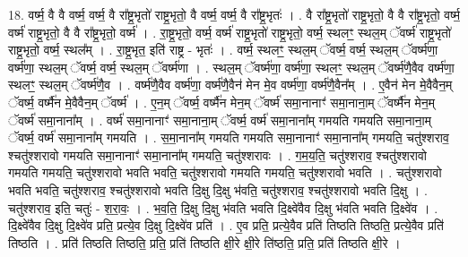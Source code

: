 \documentclass[17pt]{extarticle}
\begin{document}
18. वर्ष्म॒ वै वै वर्ष्म॒ वर्ष्म॒ वै रा᳚ष्ट्र॒भृतो॑ राष्ट्र॒भृतो॒ वै वर्ष्म॒ वर्ष्म॒ वै रा᳚ष्ट्र॒भृतः॑ । . वै रा᳚ष्ट्र॒भृतो॑ राष्ट्र॒भृतो॒ वै वै रा᳚ष्ट्र॒भृतो॒ वर्ष्म॒ वर्ष्म॑ राष्ट्र॒भृतो॒ वै वै 
रा᳚ष्ट्र॒भृतो॒ वर्ष्म॑ । . रा॒ष्ट्र॒भृतो॒ वर्ष्म॒ वर्ष्म॑ राष्ट्र॒भृतो॑ राष्ट्र॒भृतो॒ वर्ष्म॒ स्थलꣳ॒॒ स्थल॒म् ॅवर्ष्म॑ राष्ट्र॒भृतो॑ राष्ट्र॒भृतो॒ वर्ष्म॒ स्थल᳚म् । . रा॒ष्ट्र॒भृत॒ इति॑ राष्ट्र - भृतः॑ । . वर्ष्म॒ स्थलꣳ॒॒ स्थल॒म् ॅवर्ष्म॒ वर्ष्म॒ स्थल॒म् ॅवर्ष्म॑णा॒ वर्ष्म॑णा॒ स्थल॒म् ॅवर्ष्म॒ वर्ष्म॒ स्थल॒म् ॅवर्ष्म॑णा । . स्थल॒म् ॅवर्ष्म॑णा॒ वर्ष्म॑णा॒ स्थलꣳ॒॒ स्थल॒म् ॅवर्ष्म॑णै॒वैव वर्ष्म॑णा॒ स्थलꣳ॒॒ 
स्थल॒म् ॅवर्ष्म॑णै॒व । . वर्ष्म॑णै॒वैव वर्ष्म॑णा॒ वर्ष्म॑णै॒वैन॑ मेन मे॒व वर्ष्म॑णा॒ वर्ष्म॑णै॒वैन᳚म् । . ए॒वैन॑ मेन मे॒वैवैन॒म् ॅवर्ष्म॒ वर्ष्मै॑न मे॒वैवैन॒म् ॅवर्ष्म॑ । . ए॒न॒म् ॅवर्ष्म॒ वर्ष्मै॑न मेन॒म् ॅवर्ष्म॑ समा॒नानाꣳ॑ समा॒नाना॒म् ॅवर्ष्मै॑न मेन॒म् ॅवर्ष्म॑ समा॒नाना᳚म् । . वर्ष्म॑ समा॒नानाꣳ॑ समा॒नाना॒म् ॅवर्ष्म॒ वर्ष्म॑ समा॒नाना᳚म् गमयति गमयति समा॒नाना॒म् ॅवर्ष्म॒ वर्ष्म॑ समा॒नाना᳚म् गमयति । . स॒मा॒नाना᳚म् गमयति गमयति समा॒नानाꣳ॑ समा॒नाना᳚म् गमयति॒ चतु॑श्शराव॒ श्चतु॑श्शरावो गमयति समा॒नानाꣳ॑ समा॒नाना᳚म् गमयति॒ चतु॑श्शरावः । . ग॒म॒य॒ति॒ चतु॑श्शराव॒ श्चतु॑श्शरावो गमयति गमयति॒ चतु॑श्शरावो भवति भवति॒ चतु॑श्शरावो गमयति गमयति॒ चतु॑श्शरावो भवति । . चतु॑श्शरावो भवति भवति॒ चतु॑श्शराव॒ श्चतु॑श्शरावो भवति दि॒क्षु दि॒क्षु भ॑वति॒ चतु॑श्शराव॒ श्चतु॑श्शरावो भवति दि॒क्षु । . चतु॑श्शराव॒ इति॒ चतुः॑ - श॒रा॒वः॒ । . भ॒व॒ति॒ दि॒क्षु दि॒क्षु भ॑वति भवति दि॒क्ष्वे॑वैव दि॒क्षु भ॑वति भवति दि॒क्ष्वे॑व । . दि॒क्ष्वे॑वैव दि॒क्षु दि॒क्ष्वे॑व प्रति॒ प्रत्ये॒व दि॒क्षु दि॒क्ष्वे॑व प्रति॑ । . ए॒व प्रति॒ प्रत्ये॒वैव प्रति॑ तिष्ठति तिष्ठति॒ प्रत्ये॒वैव प्रति॑ तिष्ठति । . प्रति॑ तिष्ठति तिष्ठति॒ प्रति॒ प्रति॑ तिष्ठति क्षी॒रे क्षी॒रे ति॑ष्ठति॒ प्रति॒ प्रति॑ तिष्ठति क्षी॒रे । \newline
\end{document}
